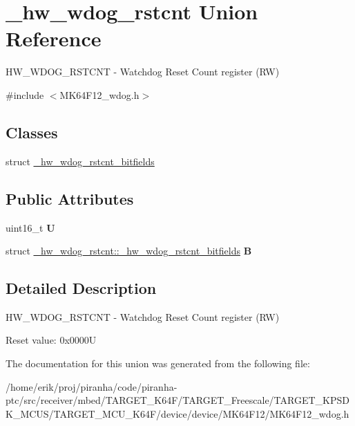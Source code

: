 \hypertarget{union__hw__wdog__rstcnt}{}\section{\+\_\+hw\+\_\+wdog\+\_\+rstcnt Union Reference}
\label{union__hw__wdog__rstcnt}


H\+W\+\_\+\+W\+D\+O\+G\+\_\+\+R\+S\+T\+C\+NT -\/ Watchdog Reset Count register (RW)  




{\ttfamily \#include $<$M\+K64\+F12\+\_\+wdog.\+h$>$}

\subsection*{Classes}
\begin{DoxyCompactItemize}
\item 
struct \hyperlink{struct__hw__wdog__rstcnt_1_1__hw__wdog__rstcnt__bitfields}{\+\_\+hw\+\_\+wdog\+\_\+rstcnt\+\_\+bitfields}
\end{DoxyCompactItemize}
\subsection*{Public Attributes}
\begin{DoxyCompactItemize}
\item 
uint16\+\_\+t {\bfseries U}\hypertarget{union__hw__wdog__rstcnt_a43f62cbbcdbd620051c391df4b2c0715}{}\label{union__hw__wdog__rstcnt_a43f62cbbcdbd620051c391df4b2c0715}

\item 
struct \hyperlink{struct__hw__wdog__rstcnt_1_1__hw__wdog__rstcnt__bitfields}{\+\_\+hw\+\_\+wdog\+\_\+rstcnt\+::\+\_\+hw\+\_\+wdog\+\_\+rstcnt\+\_\+bitfields} {\bfseries B}\hypertarget{union__hw__wdog__rstcnt_aad508138b7c752f772789c5a2b997ab3}{}\label{union__hw__wdog__rstcnt_aad508138b7c752f772789c5a2b997ab3}

\end{DoxyCompactItemize}


\subsection{Detailed Description}
H\+W\+\_\+\+W\+D\+O\+G\+\_\+\+R\+S\+T\+C\+NT -\/ Watchdog Reset Count register (RW) 

Reset value\+: 0x0000U 

The documentation for this union was generated from the following file\+:\begin{DoxyCompactItemize}
\item 
/home/erik/proj/piranha/code/piranha-\/ptc/src/receiver/mbed/\+T\+A\+R\+G\+E\+T\+\_\+\+K64\+F/\+T\+A\+R\+G\+E\+T\+\_\+\+Freescale/\+T\+A\+R\+G\+E\+T\+\_\+\+K\+P\+S\+D\+K\+\_\+\+M\+C\+U\+S/\+T\+A\+R\+G\+E\+T\+\_\+\+M\+C\+U\+\_\+\+K64\+F/device/device/\+M\+K64\+F12/M\+K64\+F12\+\_\+wdog.\+h\end{DoxyCompactItemize}
